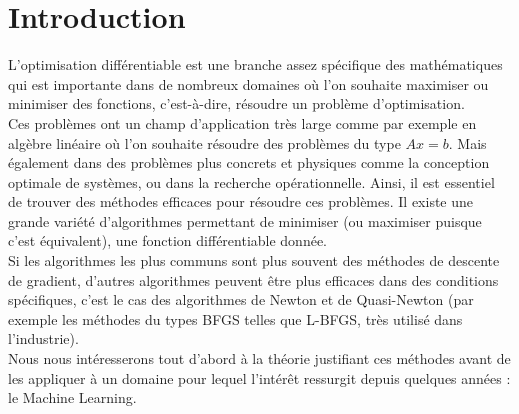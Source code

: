 \chapter{Introduction}
L'optimisation différentiable est une branche assez spécifique des mathématiques qui est importante dans de nombreux domaines où l'on souhaite maximiser ou minimiser des fonctions, c'est-à-dire, résoudre un problème d'optimisation.\\

 Ces problèmes ont un champ d'application très large comme par exemple en algèbre linéaire où l'on souhaite résoudre des problèmes du type $Ax=b$. Mais également dans des problèmes plus concrets et physiques comme la conception optimale de systèmes, ou dans la recherche opérationnelle. Ainsi, il est essentiel de trouver des méthodes efficaces pour résoudre ces problèmes. Il existe une grande variété d'algorithmes permettant de minimiser (ou maximiser puisque c'est équivalent), une fonction différentiable donnée.\\

 Si les algorithmes les plus communs sont plus souvent des méthodes de descente de gradient, d'autres algorithmes peuvent être plus efficaces dans des conditions spécifiques, c'est le cas des algorithmes de Newton et de Quasi-Newton (par exemple les méthodes du types BFGS telles que L-BFGS, très utilisé dans l'industrie).\\


Nous nous intéresserons tout d'abord à la théorie justifiant ces méthodes avant de les appliquer à un domaine pour lequel l'intérêt ressurgit depuis quelques années : le Machine Learning.
